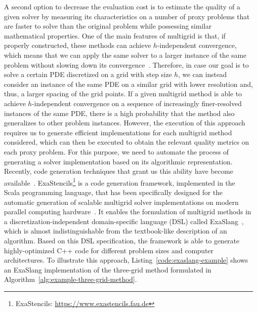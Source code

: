 A second option to decrease the evaluation cost is to estimate the quality of a given solver by measuring its characteristics on a number of proxy problems that are faster to solve than the original problem while possessing similar mathematical properties.
One of the main features of multigrid is that, if properly constructed, these methods can achieve $h$-independent convergence, which means that we can apply the same solver to a larger instance of the same problem without slowing down its convergence~\cite{trottenberg2000multigrid}.
Therefore, in case our goal is to solve a certain PDE discretized on a grid with step size $h$, we can instead consider an instance of the same PDE on a similar grid with lower resolution and, thus, a larger spacing of the grid points.
If a given multigrid method is able to achieve $h$-independent convergence on a sequence of increasingly finer-resolved instances of the same PDE, there is a high probability that the method also generalizes to other problem instances.
However, the execution of this approach requires us to generate efficient implementations for each multigrid method considered, which can then be executed to obtain the relevant quality metrics on each proxy problem.
For this purpose, we need to automate the process of generating a solver implementation based on its algorithmic representation.
Recently, code generation techniques that grant us this ability have become available~\cite{kostler2020code,schmitt2018automating}.
ExaStencils\footnote{ExaStencils: \url{https://www.exastencils.fau.de}} is a code generation framework, implemented in the Scala programming language, that has been specifically designed for the automatic generation of scalable multigrid solver implementations on modern parallel computing hardware~\cite{lengauer2014exastencils,lengauer2020exastencils}.
It enables the formulation of multigrid methods in a discretization-independent domain-specific language (DSL) called ExaSlang~\cite{schmitt2014exaslang,schmitt2016systems}, which is almost indistinguishable from the textbook-like description of an algorithm.
Based on this DSL specification, the framework is able to generate highly-optimized C++ code for different problem sizes and computer architectures.
To illustrate this approach, Listing~\ref{code:exaslang-example} shows an ExaSlang implementation of the three-grid method formulated in Algorithm~\ref{alg:example-three-grid-method}.
